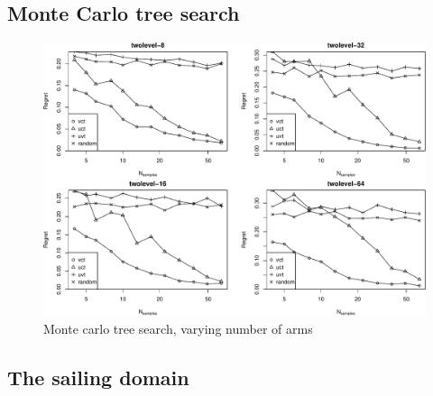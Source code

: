 \documentclass{article}
\begin{document}
\subsection{Monte Carlo tree search}

\begin{figure}[t]
\centering
\includegraphics[scale=0.64,trim=0pt 0pt 0pt 0pt,clip]{twolevel-8-16-32-64.pdf}
\caption{Monte carlo tree search, varying number of arms}
\label{fig:twolevel-8-16-32-64}
\end{figure}

\subsection{The sailing domain}
\end{document}
